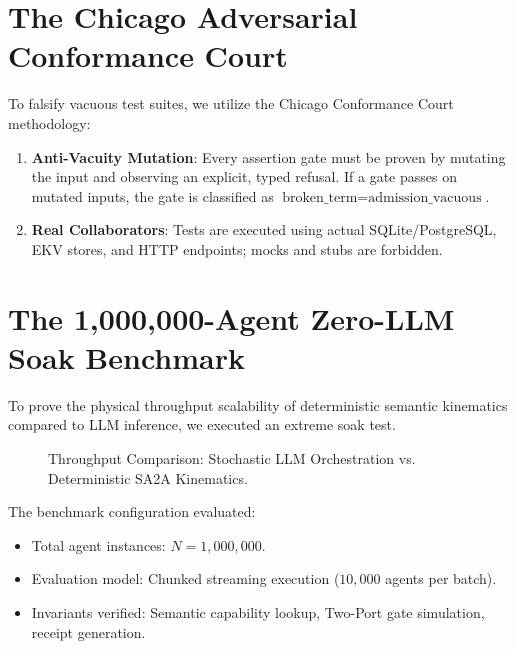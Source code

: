 \documentclass[12pt,oneside,a4paper]{book}
\theoremstyle{definition}
\theoremstyle{plain}
\theoremstyle{remark}
\begin{document}
\section{The Chicago Adversarial Conformance Court}
To falsify vacuous test suites, we utilize the Chicago Conformance Court methodology:
\begin{enumerate}
    \item \textbf{Anti-Vacuity Mutation}: Every assertion gate must be proven by mutating the input and observing an explicit, typed refusal. If a gate passes on mutated inputs, the gate is classified as $\text{broken\_term} = \text{admission\_vacuous}$.
    \item \textbf{Real Collaborators}: Tests are executed using actual SQLite/PostgreSQL, EKV stores, and HTTP endpoints; mocks and stubs are forbidden.
\end{enumerate}

\section{The 1,000,000-Agent Zero-LLM Soak Benchmark}
To prove the physical throughput scalability of deterministic semantic kinematics compared to LLM inference, we executed an extreme soak test.

\begin{figure}[h]
\centering
{}
\caption{Throughput Comparison: Stochastic LLM Orchestration vs. Deterministic SA2A Kinematics.}
\end{figure}

The benchmark configuration evaluated:
\begin{itemize}
    \item Total agent instances: $N = 1,000,000$.
    \item Evaluation model: Chunked streaming execution ($10,000$ agents per batch).
    \item Invariants verified: Semantic capability lookup, Two-Port gate simulation, receipt generation.
\end{itemize}
\end{document}
